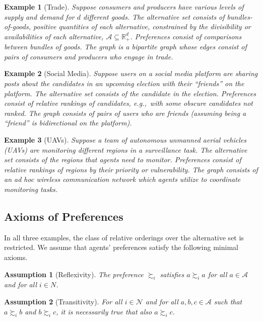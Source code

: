 \documentclass[conference]{ieeeconf}
\newcommand{\R}{\mathbb{R}}
\newcommand{\N}{\mathcal{N}}
\newcommand{\A}{\mathcal{A}}
\newcommand{\prefers}{\succsim}
\newtheorem{assumption}{Assumption}
\newtheorem{example}{Example}
\begin{document}
\begin{example}[Trade]
    Suppose consumers and producers have various levels of supply and demand for $d$ different goods. The alternative set consists of  bundles-of-goods, positive quantities of each alternative, constrained by the divisibility or availabilities of each alternative, $\A \subseteq \R^{d}_{+}$. Preferences consist of comparisons between bundles of goods. The graph is a bipartite graph whose edges consist of pairs of consumers and producers who engage in trade.
\end{example}
\begin{example}[Social Media]
    Suppose users on a social media platform are sharing posts about the candidates in an upcoming election with their ``friends'' on the platform. The alternative set consists of the candidate in the election.
    Preferences consist of relative rankings of candidates, e.g.,~with some obscure candidates not ranked. The graph consists of pairs of users who are friends (assuming being a ``friend'' is bidirectional on the platform).
\end{example}
\begin{example}[UAVs]
    Suppose a team of autonomous unmanned aerial vehicles (UAVs) are monitoring different regions in a surveillance task. The alternative set consists of the regions that agents need to monitor. Preferences consist of relative rankings of regions by their priority or vulnerability. The graph consists of an \emph{ad hoc} wireless communication network which agents utilize to coordinate monitoring tasks.
\end{example}

\subsection{Axioms of Preferences}

In all three examples, the class of relative orderings over the alternative set is restricted. We assume that agents' preferences satisfy the following minimal axioms.

\begin{assumption}[Reflexivity] \label{ass:reflexivity}
    The preference $\prefers_i$ satisfies $a \prefers_i a$ for all $a \in \A$ and for all $i \in N$.
\end{assumption}
\begin{assumption}[Transitivity]\label{ass:transitivity}
    For all $i \in \N$ and for all $a, b, c \in \A$ such that $a \prefers_i b$ and $b \prefers_i c$, it is necessarily true that also $a \prefers_i c$.
\end{assumption}
\end{document}
